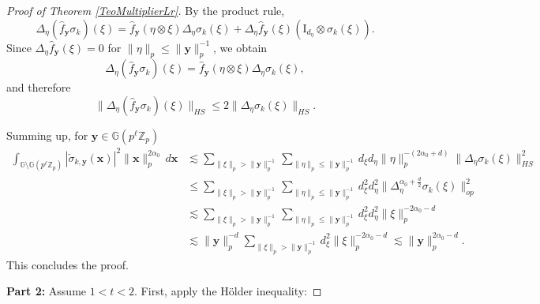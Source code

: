 \documentclass[12pt, reqno]{amsart}
\newcommand{\Z}{\mathbb{Z}}
\newcommand{\1}{\mathds{1}}
\newcommand{\G}{\mathbb{G}}
\begin{document}
\begin{proof}[Proof of Theorem \ref{TeoMultiplierLr}]
By the product rule,
\[
\Delta_\eta(\widehat{f}_{\mathbf{y}}\sigma_k)(\xi)
=
\widehat{f}_{\mathbf{y}}(\eta\otimes\xi)\Delta_\eta\sigma_k(\xi)
+
\Delta_\eta\widehat{f}_{\mathbf{y}}(\xi)
(\mathrm{I}_{d_\eta}\otimes\sigma_k(\xi)).
\]
Since $\Delta_\eta\widehat{f}_{\mathbf{y}}(\xi)=0$ for
$\|\eta\|_p \le \|\mathbf{y}\|_p^{-1}$, we obtain
\[
\Delta_\eta(\widehat{f}_{\mathbf{y}}\sigma_k)(\xi)
=
\widehat{f}_{\mathbf{y}}(\eta\otimes\xi)\Delta_\eta\sigma_k(\xi),
\]
and therefore
\[
\|\Delta_\eta(\widehat{f}_{\mathbf{y}}\sigma_k)(\xi)\|_{HS}
\le
2\|\Delta_\eta\sigma_k(\xi)\|_{HS}.
\]

Summing up, for $\mathbf{y} \in \G(p^\ell \Z_p )$
\begin{align*}    
\int_{\G \setminus \G(p^\ell \mathbb{Z}_p)}
|\check{\sigma}_{k,\mathbf{y}}(\mathbf{x})|^2
\|\mathbf{x}\|_p^{2 \alpha_0}
\,d\mathbf{x}
&\lesssim
\sum_{\|\xi\|_p > \|\mathbf{y}\|_p^{-1}}
\sum_{\|\eta\|_p \le \|\mathbf{y}\|_p^{-1}}
d_\xi d_\eta 
\|\eta\|_p^{-(2\alpha_0+d)}
\|\Delta_\eta\sigma_k(\xi)\|_{HS}^2
\\&\leq  \sum_{\|\xi\|_p > \|\mathbf{y}\|_p^{-1}}
\sum_{\|\eta\|_p \le \|\mathbf{y}\|_p^{-1}}
d_\xi^2 d_\eta^2 
\|\Delta_\eta^{\alpha_0 + \frac{d}{2}}\sigma_k(\xi)\|_{op}^2 \\ & \lesssim \sum_{\|\xi\|_p > \|\mathbf{y}\|_p^{-1}}
\sum_{\|\eta\|_p \le \|\mathbf{y}\|_p^{-1}}
d_\xi^2 d_\eta^2 
\|\xi \|_p^{-2\alpha_0 -d} \\ &\lesssim \|\mathbf{y}\|_p^{-d} \sum_{\|\xi\|_p > \|\mathbf{y}\|_p^{-1}} d_\xi^2  
\|\xi \|_p^{-2\alpha_0 -d}  \lesssim \|\mathbf{y}\|_p^{2 \alpha_0 -d} .
\end{align*}
This concludes the proof.

\textbf{Part 2:} Assume $1<t<2$. First, apply the H{\"o}lder inequality:


\end{proof}
\end{document}
